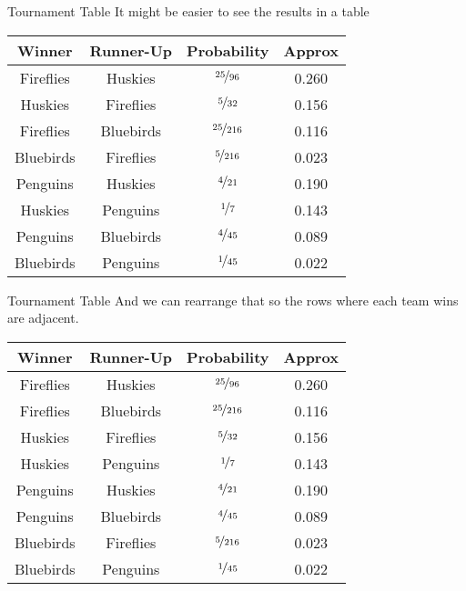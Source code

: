 \documentclass[
  ignorenonframetext,
]{beamer}
\begin{document}
\begin{frame}{Tournament Table}
\protect\hypertarget{tournament-table}{}
It might be easier to see the results in a table

\begin{longtable}[]{@{}cccc@{}}
\toprule
Winner & Runner-Up & Probability & Approx \\
\midrule
\endhead
Fireflies & Huskies & \(\nicefrac{25}{96}\) & 0.260 \\
Huskies & Fireflies & \(\nicefrac{5}{32}\) & 0.156 \\
Fireflies & Bluebirds & \(\nicefrac{25}{216}\) & 0.116 \\
Bluebirds & Fireflies & \(\nicefrac{5}{216}\) & 0.023 \\
Penguins & Huskies & \(\nicefrac{4}{21}\) & 0.190 \\
Huskies & Penguins & \(\nicefrac{1}{7}\) & 0.143 \\
Penguins & Bluebirds & \(\nicefrac{4}{45}\) & 0.089 \\
Bluebirds & Penguins & \(\nicefrac{1}{45}\) & 0.022 \\
\bottomrule
\end{longtable}
\end{frame}

\begin{frame}{Tournament Table}
\protect\hypertarget{tournament-table-1}{}
And we can rearrange that so the rows where each team wins are adjacent.

\begin{longtable}[]{@{}cccc@{}}
\toprule
Winner & Runner-Up & Probability & Approx \\
\midrule
\endhead
Fireflies & Huskies & \(\nicefrac{25}{96}\) & 0.260 \\
Fireflies & Bluebirds & \(\nicefrac{25}{216}\) & 0.116 \\
Huskies & Fireflies & \(\nicefrac{5}{32}\) & 0.156 \\
Huskies & Penguins & \(\nicefrac{1}{7}\) & 0.143 \\
Penguins & Huskies & \(\nicefrac{4}{21}\) & 0.190 \\
Penguins & Bluebirds & \(\nicefrac{4}{45}\) & 0.089 \\
Bluebirds & Fireflies & \(\nicefrac{5}{216}\) & 0.023 \\
Bluebirds & Penguins & \(\nicefrac{1}{45}\) & 0.022 \\
\bottomrule
\end{longtable}
\end{frame}
\end{document}
